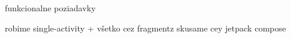 funkcionalne poziadavky 

robime single-activity + všetko cez fragmentz
skusame cey jetpack compose

